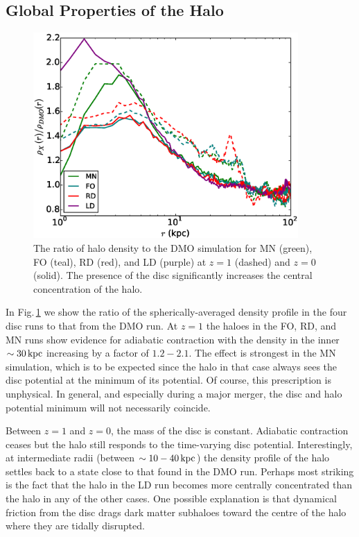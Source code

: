 \subsection{Global Properties of the Halo}

\begin{figure} \centering \includegraphics[width=0.9\textwidth]{../figures/halo_density_ratios_five_sims.eps} 
  \caption{The ratio of halo density to the DMO simulation for MN
    (green), FO (teal), RD (red), and LD (purple) at $z=1$ (dashed)
    and $z=0$ (solid). The presence of the disc significantly increases the central concentration of the halo.}
\label{fig:halo_ratios}
\end{figure}

In Fig.\,\ref{fig:halo_ratios} we show the ratio of the
spherically-averaged density profile in the four disc runs to that
from the DMO run.  At $z=1$ the haloes in the FO, RD, and MN runs show
evidence for adiabatic contraction with the density in the inner $\sim
30\,{\rm kpc}$ increasing by a factor of $1.2-2.1$.  The effect is
strongest in the MN simulation, which is to be expected since the halo
in that case always sees the disc potential at the minimum of its
potential.  Of course, this prescription is unphysical.  In general,
and especially during a major merger, the disc and halo potential
minimum will not necessarily coincide.

Between $z=1$ and $z=0$, the mass of the disc is constant.  Adiabatic
contraction ceases but the halo still responds to the time-varying
disc potential.  Interestingly, at intermediate radii (between
$\sim 10-40\,{\rm kpc}$) the density profile of the halo settles back
to a state close to that found in the DMO run.  Perhaps most striking
is the fact that the halo in the LD run becomes more centrally
concentrated than the halo in any of the other cases.  One possible explanation
is that dynamical friction from the disc drags dark matter subhaloes
toward the centre of the halo where they are tidally disrupted.

